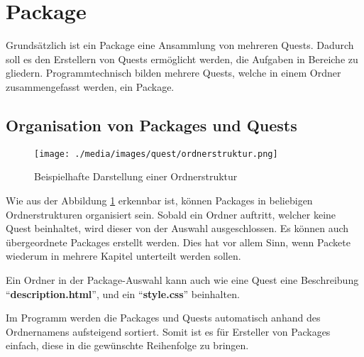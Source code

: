 \section{Package}
\label{sec:Package}
Grundsätzlich ist ein Package eine Ansammlung von mehreren Quests. Dadurch soll es den Erstellern von Quests ermöglicht werden, die Aufgaben in Bereiche zu gliedern. Programmtechnisch bilden mehrere Quests, welche in einem Ordner zusammengefasst werden, ein Package.

\subsection{Organisation von Packages und Quests}
\begin{figure}[h] 
  \centering
     \texttt{[image: ./media/images/quest/ordnerstruktur.png]}
  \caption{Beispielhafte Darstellung einer Ordnerstruktur}
  \label{fig:package_ordnerstruktur_1}
\end{figure}
Wie aus der Abbildung \ref{fig:package_ordnerstruktur_1} erkennbar ist, können Packages in beliebigen Ordnerstrukturen organisiert sein. Sobald ein Ordner auftritt, welcher keine Quest beinhaltet, wird dieser von der Auswahl ausgeschlossen. Es können auch übergeordnete Packages erstellt werden. Dies hat vor allem Sinn, wenn Packete wiederum in mehrere Kapitel unterteilt werden sollen.

Ein Ordner in der Package-Auswahl kann auch wie eine Quest eine Beschreibung “\textbf{description.html}”, und ein “\textbf{style.css}” beinhalten.

Im Programm werden die Packages und Quests automatisch anhand des Ordnernamens aufsteigend sortiert. Somit ist es für Ersteller von Packages einfach, diese in die gewünschte Reihenfolge zu bringen.